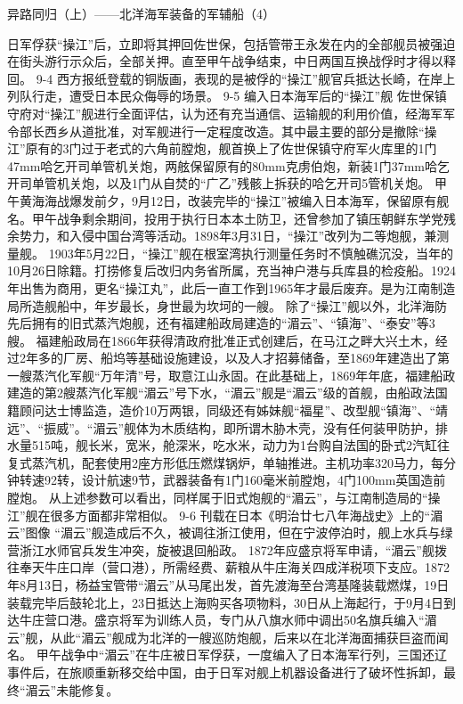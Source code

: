 \documentclass[12pt,UTF8]{ctexbook}
\begin{document}
异路同归（上）——北洋海军装备的军辅船（4）

日军俘获“操江”后，立即将其押回佐世保，包括管带王永发在内的全部舰员被强迫在街头游行示众后，全部关押。直至甲午战争结束，中日两国互换战俘时才得以释回。
9-4
西方报纸登载的铜版画，表现的是被俘的“操江”舰官兵抵达长崎，在岸上列队行走，遭受日本民众侮辱的场景。
9-5 编入日本海军后的“操江”舰
佐世保镇守府对“操江”舰进行全面评估，认为还有充当通信、运输舰的利用价值，经海军军令部长西乡从道批准，对军舰进行一定程度改造。其中最主要的部分是撤除“操江”原有的3门过于老式的六角前膛炮，舰首换上了佐世保镇守府军火库里的1门47mm哈乞开司单管机关炮，两舷保留原有的80mm克虏伯炮，新装1门37mm哈乞开司单管机关炮，以及1门从自焚的“广乙”残骸上拆获的哈乞开司5管机关炮。
甲午黄海海战爆发前夕，9月12日，改装完毕的“操江”被编入日本海军，保留原有舰名。甲午战争剩余期间，投用于执行日本本土防卫，还曾参加了镇压朝鲜东学党残余势力，和入侵中国台湾等活动。1898年3月31日，“操江”改列为二等炮舰，兼测量舰。
1903年5月22日，“操江”舰在根室湾执行测量任务时不慎触礁沉没，当年的10月26日除籍。打捞修复后改归内务省所属，充当神户港与兵库县的检疫船。1924年出售为商用，更名“操江丸”，此后一直工作到1965年才最后废弃。是为江南制造局所造舰船中，年岁最长，身世最为坎坷的一艘。
除了“操江”舰以外，北洋海防先后拥有的旧式蒸汽炮舰，还有福建船政局建造的“湄云”、“镇海”、“泰安”等3艘。
福建船政局在1866年获得清政府批准正式创建后，在马江之畔大兴土木，经过2年多的厂房、船坞等基础设施建设，以及人才招募储备，至1869年建造出了第一艘蒸汽化军舰“万年清”号，取意江山永固。在此基础上，1869年年底，福建船政建造的第2艘蒸汽化军舰“湄云”号下水，“湄云”舰是“湄云”级的首舰，由船政法国籍顾问达士博监造，造价10万两银，同级还有姊妹舰“福星”、改型舰“镇海”、“靖远”、“振威”。“湄云”舰体为木质结构，即所谓木胁木壳，没有任何装甲防护，排水量515吨，舰长米，宽米，舱深米，吃水米，动力为1台购自法国的卧式2汽缸往复式蒸汽机，配套使用2座方形低压燃煤锅炉，单轴推进。主机功率320马力，每分钟转速92转，设计航速9节，武器装备有1门160毫米前膛炮，4门100mm英国造前膛炮。 从上述参数可以看出，同样属于旧式炮舰的“湄云”，与江南制造局的“操江”舰在很多方面都非常相似。
9-6 刊载在日本《明治廿七八年海战史》上的“湄云”图像
“湄云”舰造成后不久，被调往浙江使用，但在宁波停泊时，舰上水兵与绿营浙江水师官兵发生冲突，旋被退回船政。 1872年应盛京将军申请，“湄云”舰拨往奉天牛庄口岸（营口港），所需经费、薪粮从牛庄海关四成洋税项下支应。1872年8月13日，杨益宝管带“湄云”从马尾出发，首先渡海至台湾基隆装载燃煤，19日装载完毕后鼓轮北上，23日抵达上海购买各项物料，30日从上海起行，于9月4日到达牛庄营口港。盛京将军为训练人员，专门从八旗水师中调出50名旗兵编入“湄云”舰，从此“湄云”舰成为北洋的一艘巡防炮舰，后来以在北洋海面捕获巨盗而闻名。 甲午战争中“湄云”在牛庄被日军俘获，一度编入了日本海军行列，三国还辽事件后，在旅顺重新移交给中国，由于日军对舰上机器设备进行了破坏性拆卸，最终“湄云”未能修复。
\end{document}
